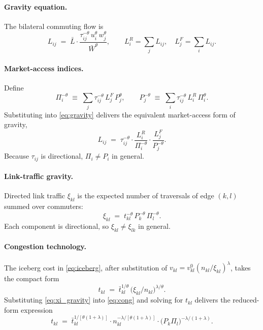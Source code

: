 \documentclass[12pt]{article}
\newcommand{\Lbar}{\bar L}
\newcommand{\Wbar}{\bar W}
\newcommand{\tbar}{\bar t}
\newcommand{\tkl}{t_{kl}}
\newcommand{\tijk}{\tau_{ij}}
\begin{document}
\paragraph{Gravity equation.}
The bilateral commuting flow is
\begin{equation}
  L_{ij}\;=\;\Lbar\cdot
  \frac{\tijk^{-\theta}\,u_i^{\theta}\,w_j^{\theta}}{\Wbar^{\theta}},
  \qquad
  L_i^R=\sum_j L_{ij},\quad L_j^F=\sum_i L_{ij}.
  \label{eq:gravity}
\end{equation}

\paragraph{Market-access indices.}
Define
\begin{equation}
  \Pi_i^{-\theta}\;\equiv\;\sum_{j}\tijk^{-\theta}\,L_j^F\,P_j^{\theta},
  \qquad
  P_j^{-\theta}\;\equiv\;\sum_{i}\tijk^{-\theta}\,L_i^R\,\Pi_i^{\theta}.
  \label{eq:MA_def}
\end{equation}
Substituting into \eqref{eq:gravity} delivers the equivalent
market-access form of gravity,
\begin{equation}
  L_{ij}\;=\;\tijk^{-\theta}\cdot
  \frac{L_i^R}{\Pi_i^{-\theta}}\cdot
  \frac{L_j^F}{P_j^{-\theta}}.
  \label{eq:gravity_MA}
\end{equation}
Because $\tijk$ is directional, $\Pi_i\ne P_i$ in general.

\paragraph{Link-traffic gravity.}
Directed link traffic $\xi_{kl}$ is the expected number of
traversals of edge $(k,l)$ summed over commuters:
\begin{equation}
  \xi_{kl}\;=\;\tkl^{-\theta}\,P_k^{-\theta}\,\Pi_l^{-\theta}.
  \label{eq:xi_gravity}
\end{equation}
Each component is directional, so $\xi_{kl}\ne\xi_{lk}$ in general.

\paragraph{Congestion technology.}
The iceberg cost in \eqref{eq:iceberg}, after substitution of
$v_{kl}=v^{0}_{kl}(n_{kl}/\xi_{kl})^{\lambda}$, takes the compact
form
\begin{equation}
  \tkl
  \;=\;
  \tbar_{kl}^{1/\theta}\,
  \bigl(\xi_{kl}/n_{kl}\bigr)^{\lambda/\theta}.
  \label{eq:cong}
\end{equation}
Substituting \eqref{eq:xi_gravity} into \eqref{eq:cong} and solving
for $\tkl$ delivers the reduced-form expression
\begin{equation}
  \tkl
  \;=\;
  \tbar_{kl}^{1/[\theta(1+\lambda)]}\cdot
  n_{kl}^{-\lambda/[\theta(1+\lambda)]}\cdot
  \bigl(P_k\Pi_l\bigr)^{-\lambda/(1+\lambda)}.
  \label{eq:tkl_reduced}
\end{equation}
\end{document}
